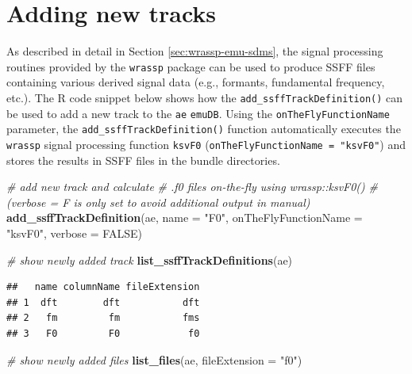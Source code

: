 \documentclass[]{book}
\newenvironment{Shaded}{\begin{snugshade}}{\end{snugshade}}
\newcommand{\CommentTok}[1]{\textcolor[rgb]{0.56,0.35,0.01}{\textit{#1}}}
\newcommand{\DataTypeTok}[1]{\textcolor[rgb]{0.13,0.29,0.53}{#1}}
\newcommand{\KeywordTok}[1]{\textcolor[rgb]{0.13,0.29,0.53}{\textbf{#1}}}
\newcommand{\NormalTok}[1]{#1}
\newcommand{\OtherTok}[1]{\textcolor[rgb]{0.56,0.35,0.01}{#1}}
\newcommand{\StringTok}[1]{\textcolor[rgb]{0.31,0.60,0.02}{#1}}
\begin{document}
\hypertarget{adding-new-tracks}{%
\section{Adding new tracks}\label{adding-new-tracks}}

As described in detail in Section \ref{sec:wrassp-emu-sdms}, the signal processing routines provided by the \texttt{wrassp} package can be used to produce SSFF files containing various derived signal data (e.g., formants, fundamental frequency, etc.). The R code snippet below shows how the \texttt{add\_ssffTrackDefinition()} can be used to add a new track to the \texttt{ae} \texttt{emuDB}. Using the \texttt{onTheFlyFunctionName} parameter, the \texttt{add\_ssffTrackDefinition()} function automatically executes the \texttt{wrassp} signal processing function \texttt{ksvF0} (\texttt{onTheFlyFunctionName\ =\ "ksvF0"}) and stores the results in SSFF files in the bundle directories.

\begin{Shaded}
\begin{Highlighting}[]
\CommentTok{# add new track and calculate}
\CommentTok{# .f0 files on-the-fly using wrassp::ksvF0()}
\CommentTok{# (verbose = F is only set to avoid additional output in manual)}
\KeywordTok{add_ssffTrackDefinition}\NormalTok{(ae,}
                        \DataTypeTok{name =} \StringTok{"F0"}\NormalTok{,}
                        \DataTypeTok{onTheFlyFunctionName =} \StringTok{"ksvF0"}\NormalTok{,}
                        \DataTypeTok{verbose =} \OtherTok{FALSE}\NormalTok{)}

\CommentTok{# show newly added track}
\KeywordTok{list_ssffTrackDefinitions}\NormalTok{(ae)}
\end{Highlighting}
\end{Shaded}

\begin{verbatim}
##   name columnName fileExtension
## 1  dft        dft           dft
## 2   fm         fm           fms
## 3   F0         F0            f0
\end{verbatim}

\begin{Shaded}
\begin{Highlighting}[]
\CommentTok{# show newly added files}
\KeywordTok{list_files}\NormalTok{(ae, }\DataTypeTok{fileExtension =} \StringTok{"f0"}\NormalTok{)}
\end{Highlighting}
\end{Shaded}
\end{document}
